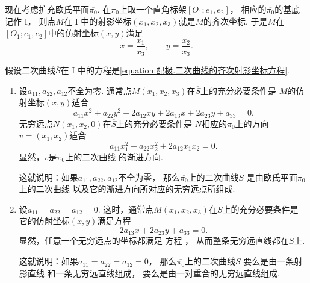 现在考虑扩充欧氏平面\(\overline{\pi_0}\).
在\(\pi_0\)上取一个直角标架\([O_1;e_1,e_2]\)，
相应的\(\overline{\pi_0}\)的基底记作 I，
则点\(M\)在 I 中的射影坐标\((x_1,x_2,x_3)\)就是\(M\)的齐次坐标.
于是\(M\)在\([O_1;e_1,e_2]\)中的仿射坐标\((x,y)\)满足\begin{equation*}
	x = \frac{x_1}{x_3},
	\qquad
	y = \frac{x_2}{x_3}.
\end{equation*}

假设二次曲线\(\overline{S}\)在 I 中的方程是\cref{equation:配极.二次曲线的齐次射影坐标方程}.
\begingroup
{}
\begin{enumerate}[label={{\rm\bf 情形}\arabic*.}]
	\item 设\(a_{11},a_{22},a_{12}\)不全为零.
	通常点\(M(x_1,x_2,x_3)\)在\(\overline{S}\)上的充分必要条件是
	\(M\)的仿射坐标\((x,y)\)适合\begin{equation}\label{equation:配极.二次曲线的非齐次仿射坐标方程1}
		a_{11} x^2
		+ a_{22} y^2
		+ 2 a_{12} x y
		+ 2 a_{13} x
		+ 2 a_{23} y
		+ a_{33}
		= 0.
	\end{equation}
	无穷远点\(N(x_1,x_2,0)\)在\(\overline{S}\)上的充分必要条件是
	\(N\)相应的\(\pi_0\)上的方向\(v = (x_1,x_2)\)适合\begin{equation}
		a_{11} x_1^2
		+ a_{22} x_2^2
		+ 2 a_{12} x_1 x_2
		= 0.
	\end{equation}
	显然，\(v\)是\(\pi_0\)上的二次曲线  的渐进方向.

	这就说明：如果\(a_{11},a_{22},a_{12}\)不全为零，
	那么\(\overline{\pi_0}\)上的二次曲线\(\overline{S}\)
	是由欧氏平面\(\pi_0\)上的二次曲线 
	以及它的渐进方向所对应的无穷远点所组成.

	\item 设\(a_{11} = a_{22} = a_{12} = 0\).
	这时，通常点\(M(x_1,x_2,x_3)\)在\(\overline{S}\)上的充分必要条件是
	它的仿射坐标\((x,y)\)满足方程\begin{equation}\label{equation:配极.二次曲线的非齐次仿射坐标方程2}
		2 a_{13} x
		+ 2 a_{23} y
		+ a_{33} = 0.
	\end{equation}
	显然，任意一个无穷远点的坐标都满足
	方程 ，
	从而整条无穷远直线都在\(\overline{S}\)上.

	这就说明：如果\(a_{11} = a_{22} = a_{12} = 0\)，
	那么\(\overline{\pi_0}\)上的二次曲线\(\overline{S}\)
	要么是由一条射影直线 
	和一条无穷远直线组成，
	要么是由一对重合的无穷远直线组成.
\end{enumerate}
\endgroup

